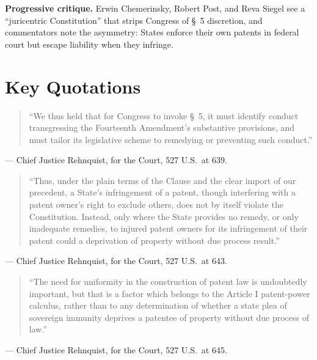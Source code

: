 \documentclass[12pt]{article}
\begin{document}
\textbf{Progressive critique.} Erwin Chemerinsky, Robert Post, and Reva Siegel see a ``juricentric Constitution'' that strips Congress of \S~5 discretion, and commentators note the asymmetry: States enforce their own patents in federal court but escape liability when they infringe.

\section{Key Quotations}

\begin{quote}
``We thus held that for Congress to invoke \S~5, it must identify conduct transgressing the Fourteenth Amendment's substantive provisions, and must tailor its legislative scheme to remedying or preventing such conduct.''
\end{quote}
\noindent --- Chief Justice Rehnquist, for the Court, 527 U.S.\ at 639.

\begin{quote}
``Thus, under the plain terms of the Clause and the clear import of our precedent, a State's infringement of a patent, though interfering with a patent owner's right to exclude others, does not by itself violate the Constitution. Instead, only where the State provides no remedy, or only inadequate remedies, to injured patent owners for its infringement of their patent could a deprivation of property without due process result.''
\end{quote}
\noindent --- Chief Justice Rehnquist, for the Court, 527 U.S.\ at 643.

\begin{quote}
``The need for uniformity in the construction of patent law is undoubtedly important, but that is a factor which belongs to the Article I patent-power calculus, rather than to any determination of whether a state plea of sovereign immunity deprives a patentee of property without due process of law.''
\end{quote}
\noindent --- Chief Justice Rehnquist, for the Court, 527 U.S.\ at 645.
\end{document}
